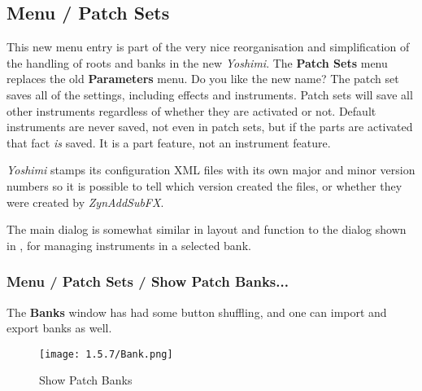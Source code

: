 %
%
%

\subsection{Menu / Patch Sets}
\label{subsubsec:menu_patch_sets}

   This new menu entry is part of the very nice reorganisation and simplification
   of the handling of roots and banks in the new \textsl{Yoshimi}.  The
   \textbf{Patch Sets} menu replaces the old \textbf{Parameters} menu.  Do you
   like the new name?  The patch set saves all of the settings, including effects
   and instruments.  Patch sets will save all other instruments regardless of
   whether they are activated or not.  Default instruments are never saved, not
   even in patch sets, but if the parts are activated that fact \textsl{is}
   saved.  It is a part feature, not an instrument feature.

   \textsl{Yoshimi} stamps its configuration XML files with its own major and
   minor version numbers so it is possible to tell which version created the
   files, or whether they were created by \textsl{ZynAddSubFX}.

   The main dialog is somewhat similar in layout and function to the
   dialog shown in
   ,
   for managing instruments in a selected bank.

\subsubsection{Menu / Patch Sets / Show Patch Banks...}
\label{subsubsec:menu_patch_sets_show_patch_banks}

   The \textbf{Banks} window has had some button shuffling, and one can
   import and export banks as well.

\begin{figure}[H]
   \centering
   \texttt{[image: 1.5.7/Bank.png]}
   \caption[Show Patch Banks]{Show Patch Banks}
   \label{fig:show_patch_banks}
\end{figure}

